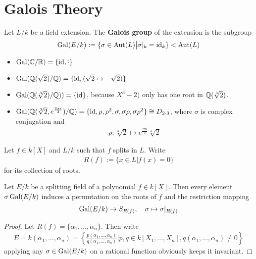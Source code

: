 \section{Galois Theory}

\begin{dfn}[]
  Let $L/k$ be a field extension. The \textbf{Galois group} of the extension is the subgroup
  \begin{align*}
    \operatorname{Gal}(E/k) := \{\sigma \in \operatorname{Aut}(L) \big\vert \sigma|_k = \operatorname{id}_k\} < \operatorname{Aut}(L)
  \end{align*}
\end{dfn}
\begin{itemize}
  \item $\operatorname{Gal}(\mathbb{C}/\mathbb{R}) = \{\operatorname{id}, \overline{\cdot}\}$
  \item $\operatorname{Gal}(\mathbb{Q}(\sqrt{2})/\mathbb{Q}) = \{\operatorname{id}, (\sqrt{2} \mapsto  - \sqrt{2})\}$
  \item $\operatorname{Gal}(\mathbb{Q}(\sqrt[3]{2})/\mathbb{Q})) = \{\operatorname{id}\}$, because $X^{3} - 2)$ only has one root in $\mathbb{Q}(\sqrt[3]{2})$.
  \item $\operatorname{Gal}(\mathbb{Q}(\sqrt[3]{2},e^{\frac{2 \pi i }{3}})/\mathbb{Q}) = \{\operatorname{id}, \rho,\rho^{2},\sigma, \sigma \rho, \sigma \rho^{2}\} \cong D_{2 \cdot 3}$, where $\sigma$ is complex conjugation and
    \begin{align*}
      \rho: \sqrt[3]{2} \mapsto e^{\frac{2 \pi i }{3}}\sqrt[3]{2}
    \end{align*}
\end{itemize}


\begin{dfn}[]
  Let $f \in k[X]$ and $L/k$ such that $f$ splits in $L$. Write
  \begin{align*}
    R(f) := \{x \in L \big\vert f(x) = 0\} 
  \end{align*}
  for its collection of roots.
\end{dfn}

\begin{lem}[]
  Let $E/k$ be a splitting field of a polynomial $f \in k [X]$.
  Then every element $\sigma \operatorname{Gal}(E/k)$ induces a permutation on the roots of $f$ and the restriction mapping
  \begin{align*}
    \operatorname{Gal}(E/k) \to  S_{R(f)}, \quad \sigma \mapsto  \sigma|_{R(f)}
  \end{align*}
\end{lem}
\begin{proof}
  Let $R(f) = \{\alpha_{1}, \ldots, \alpha_{n}\}$. Then write
  \begin{align*}
    E = k(\alpha_{1}, \ldots, \alpha_{n}) = \left\{
      \frac{p(\alpha_{1}, \ldots, \alpha_{n})}{q(\alpha_{1}, \ldots, \alpha_{n})} \big\vert p,q \in k[X_{1}, \ldots, X_{n}], q(\alpha_{1}, \ldots, \alpha_{n}) \neq 0
    \right\}
  \end{align*}
  applying any $\sigma \in \operatorname{Gal}(E/k)$ on a rational function obviously keeps it invariant.
\end{proof}




